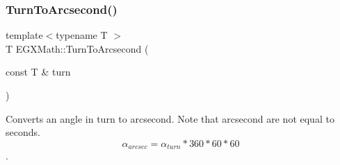 \mbox{\label{group___e_g_x_math-_angle_conversions-_turn_gaad072969abc59ef6f5b63ac6a176a11b}} 
\subsubsection{\texorpdfstring{Turn\+To\+Arcsecond()}{TurnToArcsecond()}}
{\footnotesize\ttfamily template$<$typename T $>$ \\
T E\+G\+X\+Math\+::\+Turn\+To\+Arcsecond (\begin{DoxyParamCaption}\item[{const T \&}]{turn }\end{DoxyParamCaption})}



Converts an angle in turn to arcsecond. Note that arcsecond are not equal to seconds. \[\alpha_{arcsec}=\alpha_{turn} * 360 * 60 * 60\]. 

